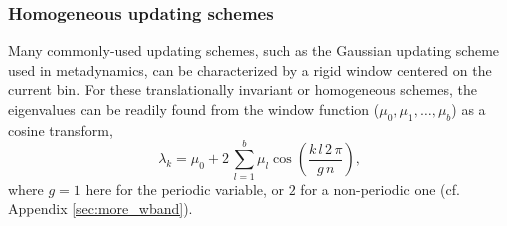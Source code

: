 \documentclass[reprint, superscriptaddress, floatfix]{revtex4-1}
\newcommand{\Err}{E}
\begin{document}
%




\subsubsection{\label{sec:band-matrix}
Homogeneous updating schemes}



Many commonly-used updating schemes,
such as the Gaussian updating scheme
used in metadynamics,
can be characterized by a rigid window
centered on the current bin.
%
For these translationally invariant or homogeneous
schemes, the eigenvalues can be readily found
from the window function ($\mu_0, \mu_1, \dots, \mu_b$)
as a cosine transform,
%
\begin{equation}
  \lambda_k
  =
  \mu_0
  +
  2 \,
  \sum_{ l = 1 }^b
  \mu_l
  \cos\left(
  \frac{ k \, l \, 2 \, \pi }
       {      g \, n        }
  \right)
  ,
  \label{eq:wband_eigenvalue}
\end{equation}
%
where $g = 1$ here for the periodic variable,
or $2$ for a non-periodic one
(cf. Appendix \ref{sec:more_wband}).
\end{document}
